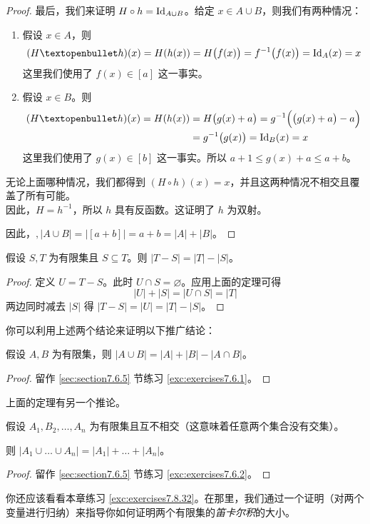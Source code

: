 \begin{proof}
    最后，我们来证明 $H \circ h = \text{Id}_{A \cup B}$。给定 $x \in A \cup B$，则我们有两种情况：
    \begin{enumerate}[label=(\arabic*)]
        \item 假设 $x \in A$，则
            \[(H ◦ h)(x) = H(h(x)) = H\big(f(x)\big) = f^{-1}\big(f(x)\big) = \id_A(x) = x\]
            这里我们使用了 $f(x) \in [a]$ 这一事实。
        \item 假设 $x \in B$。则
        \begin{align*}
            (H ◦ h)(x) = H(h(x)) &= H\big(g(x)+a\big) = g^{-1}\Big(\big(g(x)+a\big)-a\Big)\\
            &= g^{-1}\big(g(x)\big) = \id_B(x) = x
        \end{align*}
            这里我们使用了 $g(x) \in [b]$ 这一事实。所以 $a + 1 \le g(x) + a \le a + b$。
    \end{enumerate}
    无论上面哪种情况，我们都得到 $(H \circ h)(x) = x$，并且这两种情况不相交且覆盖了所有可能。\\

    因此，$H = h^{-1}$，所以 $h$ 具有反函数。这证明了 $h$ 为双射。

    因此，$, |A \cup B| = |[a + b]| = a + b = |A| + |B|$。
\end{proof}

\begin{corollary}
    假设 $S,T$ 为有限集且 $S \subseteq T$。则 $|T-S| = |T|-|S|$。
\end{corollary}

\begin{proof}
    定义 $U = T - S$。此时 $U \cap S = \varnothing$。应用上面的定理可得
    \[|U| + |S| = |U \cap S| = |T|\]
    两边同时减去 $|S|$ 得 $ |T - S| = |U| = |T| - |S|$。
\end{proof}

你可以利用上述两个结论来证明以下推广结论：

\begin{proposition}\label{prop:proposition7.6.9}
    假设 $A,B$ 为有限集，则 $|A \cup B| = |A| + |B| - |A \cap B|$。
\end{proposition}

\begin{proof}
    留作 \ref{sec:section7.6.5} 节练习 \ref{exc:exercises7.6.1}。
\end{proof}

上面的定理有另一个推论。

\begin{corollary}\label{corollary7.6.10}
    假设 $A_1,B_2,\dots,A_n$ 为有限集且互不相交（这意味着任意两个集合没有交集）。

    则 $|A_1 \cup \dots \cup A_n| = |A_1| + \dots + |A_n|$。
\end{corollary}

\begin{proof}
    留作 \ref{sec:section7.6.5} 节练习 \ref{exc:exercises7.6.2}。
\end{proof}

你还应该看看本章练习 \ref{exc:exercises7.8.32}。在那里，我们通过一个证明（对两个变量进行归纳）来指导你如何证明两个有限集的\emph{笛卡尔积}的大小。